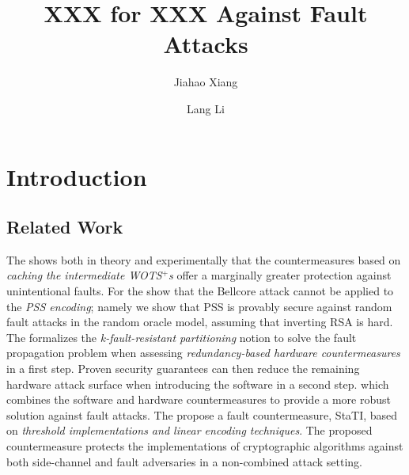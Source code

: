\documentclass[journal=tches,final]{iacrtrans}
\author{Jiahao Xiang\inst{1} \and Lang Li\inst{1}}
\institute{
  Hengyang Normal University, College of Computer Science and Technology, Hengyang, China
}
\title{ XXX for XXX Against Fault Attacks}
\begin{document}
\maketitle




\begin{abstract}

\end{abstract}


\section{Introduction}

\subsection{Related Work}

The \cite{TCHES:Genet23} shows both in theory and experimentally that the countermeasures based on \textit{caching the intermediate
WOTS$^{+}$s} offer a marginally greater protection against unintentional faults. 
For the \cite{AC:CorMan09} show that the Bellcore attack cannot be applied to the \textit{PSS encoding}; namely we show that PSS is provably secure against random fault attacks in the random oracle model, assuming that inverting RSA is hard. 
The \cite{TCHES:THNABC24}  formalizes the \textit{k-fault-resistant partitioning} notion to solve the fault propagation problem when assessing \textit{redundancy-based hardware countermeasures} in a first step. Proven security guarantees can then reduce the remaining hardware attack surface when introducing the software in a second step. which combines the software and hardware countermeasures to provide a more robust solution against fault attacks. 
The \cite{TCHES:DhoOvcTop24} propose a fault countermeasure, StaTI, based on \textit{threshold implementations and linear encoding techniques}. The proposed countermeasure protects the implementations of cryptographic algorithms against both side-channel and fault adversaries in a non-combined attack setting.



\end{document}
